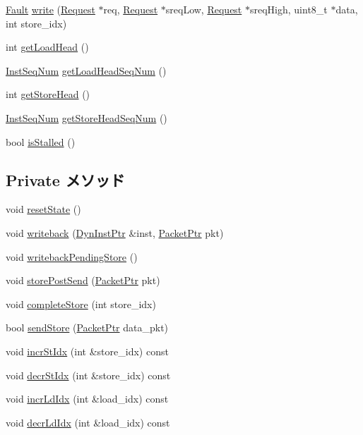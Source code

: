 \begin{DoxyCompactItemize}
\item 
\hyperlink{classRefCountingPtr}{Fault} \hyperlink{classLSQUnit_a8910d991217dd388c788727f8ebbb267}{write} (\hyperlink{classRequest}{Request} $\ast$req, \hyperlink{classRequest}{Request} $\ast$sreqLow, \hyperlink{classRequest}{Request} $\ast$sreqHigh, uint8\_\-t $\ast$data, int store\_\-idx)
\item 
int \hyperlink{classLSQUnit_ad43a7408f4e1c1e181bc40ecab6dc593}{getLoadHead} ()
\item 
\hyperlink{inst__seq_8hh_a258d93d98edaedee089435c19ea2ea2e}{InstSeqNum} \hyperlink{classLSQUnit_aee7352adadc6b43b7ce36a8c052eb222}{getLoadHeadSeqNum} ()
\item 
int \hyperlink{classLSQUnit_ab9d14b0deb8ab44dc09ac784b162e774}{getStoreHead} ()
\item 
\hyperlink{inst__seq_8hh_a258d93d98edaedee089435c19ea2ea2e}{InstSeqNum} \hyperlink{classLSQUnit_a1813b58ab7569d6aeefb5d4e235cceda}{getStoreHeadSeqNum} ()
\item 
bool \hyperlink{classLSQUnit_af8eb8590fbfa6ecd2f796390677a4c00}{isStalled} ()
\end{DoxyCompactItemize}
\subsection*{Private メソッド}
\begin{DoxyCompactItemize}
\item 
void \hyperlink{classLSQUnit_a755ee993c2d4e9d422c37990b15afa37}{resetState} ()
\item 
void \hyperlink{classLSQUnit_a3911bacb8817c31cfbeefd125dba0217}{writeback} (\hyperlink{classLSQUnit_a028ce10889c5f6450239d9e9a7347976}{DynInstPtr} \&inst, \hyperlink{classPacket}{PacketPtr} pkt)
\item 
void \hyperlink{classLSQUnit_a173d8fd73280b1cf5b4d0dd9b68cf0cf}{writebackPendingStore} ()
\item 
void \hyperlink{classLSQUnit_a6f23a0d213e7d35f445f9cabfd2ed0cc}{storePostSend} (\hyperlink{classPacket}{PacketPtr} pkt)
\item 
void \hyperlink{classLSQUnit_a12ec7cad6ac51a53bca7795588885e5c}{completeStore} (int store\_\-idx)
\item 
bool \hyperlink{classLSQUnit_a268a51a93dbdda9a0cff48ba036e673e}{sendStore} (\hyperlink{classPacket}{PacketPtr} data\_\-pkt)
\item 
void \hyperlink{classLSQUnit_a7576fc9eec69e3ce28ce7af7ad87416a}{incrStIdx} (int \&store\_\-idx) const 
\item 
void \hyperlink{classLSQUnit_a4ebe3751617bcb686e225184f77f971c}{decrStIdx} (int \&store\_\-idx) const 
\item 
void \hyperlink{classLSQUnit_a129dcadec1d9a805428c1cfd14bcad5e}{incrLdIdx} (int \&load\_\-idx) const 
\item 
void \hyperlink{classLSQUnit_a313eca7abdfb7c6642078e21bc49a968}{decrLdIdx} (int \&load\_\-idx) const 
\end{DoxyCompactItemize}
